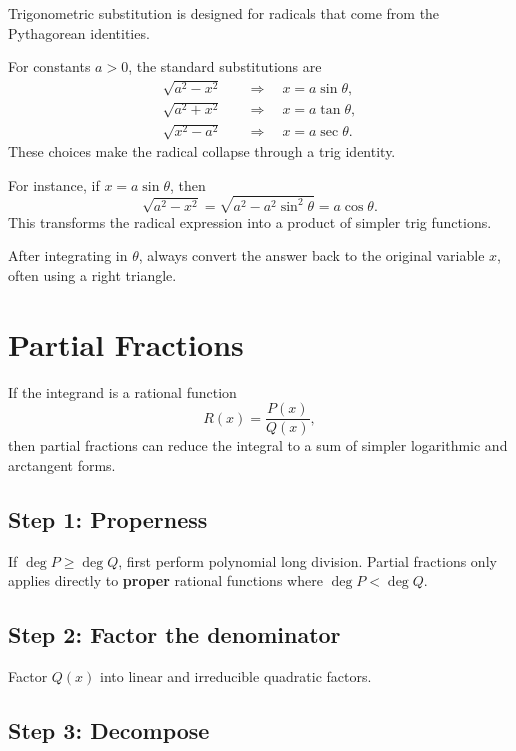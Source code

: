 Trigonometric substitution is designed for radicals that come from the Pythagorean identities.

\begin{definition}
For constants $a>0$, the standard substitutions are
\begin{align*}
\sqrt{a^2-x^2} &\quad \Rightarrow \quad x=a\sin\theta, \\
\sqrt{a^2+x^2} &\quad \Rightarrow \quad x=a\tan\theta, \\
\sqrt{x^2-a^2} &\quad \Rightarrow \quad x=a\sec\theta.
\end{align*}
These choices make the radical collapse through a trig identity.
\end{definition}

For instance, if $x=a\sin\theta$, then
$$\sqrt{a^2-x^2} = \sqrt{a^2-a^2\sin^2\theta} = a\cos\theta.$$ 
This transforms the radical expression into a product of simpler trig functions.

\begin{remark}
After integrating in $\theta$, always convert the answer back to the original variable $x$, often using a right triangle.
\end{remark}

\section*{Partial Fractions}

If the integrand is a rational function
$$R(x)=\frac{P(x)}{Q(x)},$$
then partial fractions can reduce the integral to a sum of simpler logarithmic and arctangent forms.

\subsection*{Step 1: Properness}

If $\deg P \ge \deg Q$, first perform polynomial long division. Partial fractions only applies directly to \textbf{proper} rational functions where $\deg P < \deg Q$.

\subsection*{Step 2: Factor the denominator}

Factor $Q(x)$ into linear and irreducible quadratic factors.

\subsection*{Step 3: Decompose}

